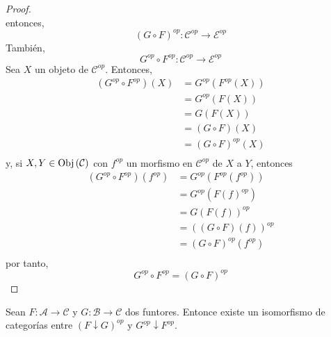 \documentclass[12pt]{report}
\newcounter{it}
\theoremstyle{largebreak}
\newcommand\cf[3]{\ensuremath{#1:#2\rightarrow#3}}
\newcommand{\Obj}[1]{\ensuremath{\textup{Obj}\left(#1\right)}}
\begin{document}
\begin{proof}
\begin{equation*}
        \end{equation*}
        entonces,
        \begin{equation*}
            \cf{(G\circ F)^{op}}{\mathcal{C}^{op}}{\mathcal{E}^{op}}
        \end{equation*}
        También,
        \begin{equation*}
            \cf{G^{op}\circ F^{op}}{\mathcal{C}^{op}}{\mathcal{E}^{op}}
        \end{equation*}
        Sea $X$ un objeto de $\mathcal{C}^{op}$. Entonces,
        \begin{equation*}
            \begin{split}
                (G^{op}\circ F^{op})(X)&=G^{op}(F^{op}(X))\\
                &=G^{op}(F(X))\\
                &=G(F(X))\\
                &=(G\circ F)(X)\\
                &=(G\circ F)^{op}(X)\\
            \end{split}
        \end{equation*}
        y, si $X,Y\in\Obj{\mathcal{C}}$ con $f^{op}$ un morfismo en $\mathcal{C}^{op}$ de $X$ a $Y$, entonces
        \begin{equation*}
            \begin{split}
                (G^{op}\circ F^{op})(f^{op})&=G^{op}(F^{op}(f^{op}))\\
                &=G^{op}(F(f)^{op})\\
                &=G(F(f))^{op}\\
                &=((G\circ F)(f))^{op}\\
                &=(G\circ F)^{op}(f^{op})\\
            \end{split}
        \end{equation*}
        por tanto,
        \begin{equation*}
            G^{op}\circ F^{op}=(G\circ F)^{op}
        \end{equation*}
    \end{proof}


    \renewcommand{\theenumi}{\arabic{enumi}}

    \begin{propo}
        Sean $\cf{F}{\mathcal{A}}{\mathcal{C}}$ y $\cf{G}{\mathcal{B}}{\mathcal{C}}$ dos funtores. Entonce existe un isomorfismo de categorías entre $(F\downarrow G)^{op}$ y $G^{op}\downarrow F^{op}$.
    \end{propo}
\end{document}

